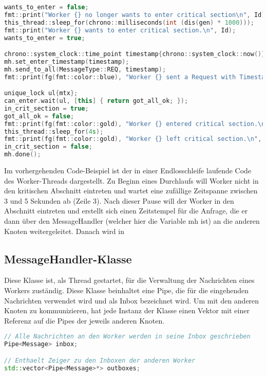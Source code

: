 \documentclass{article}
\begin{document}
\begin{minipage}{\linewidth}
\begin{lstlisting}[language=C++, caption=Zeitliche Regelung]
wants_to_enter = false;
fmt::print("Worker {} no longer wants to enter critical section\n", Id);
this_thread::sleep_for(chrono::milliseconds(int (dis(gen) * 1000)));
fmt::print("Worker {} wants to enter critical section.\n", Id);
wants_to_enter = true;

chrono::system_clock::time_point timestamp{chrono::system_clock::now()};
mh.set_enter_timestamp(timestamp);
mh.send_to_all(MessageType::REQ, timestamp);
fmt::print(fg(fmt::color::blue), "Worker {} sent a Request with Timestamp {:%H:%M:%S} to all other Workers.\n", Id, timestamp);

unique_lock ul{mtx};
can_enter.wait(ul, [this] { return got_all_ok; });
in_crit_section = true;
got_all_ok = false;
fmt::print(fg(fmt::color::gold), "Worker {} entered critical section.\n", Id);
this_thread::sleep_for(4s);
fmt::print(fg(fmt::color::gold), "Worker {} left critical section.\n", Id);
in_crit_section = false;
mh.done();

\end{lstlisting}
\end{minipage}

Im vorhergehenden Code-Beispiel ist der in einer Endlosschleife laufende Code des Worker-Threads dargestellt. Zu Beginn eines Durchlaufs will Worker nicht in den kritischen Abschnitt eintreten und wartet eine zufällige Zeitspanne zwischen 3 und 5 Sekunden ab (Zeile 3). Nach dieser Pause will der Worker in den Abschnitt eintreten und erstellt sich einen Zeitstempel für die Anfrage, die er dann über den MessageHandler (welcher hier die Variable mh ist) an die anderen Knoten weitergeleitet. Danach wird in 

\subsection{MessageHandler-Klasse}
Diese Klasse ist, als Thread gestartet, für die Verwaltung der Nachrichten eines Workers zuständig. Diese Klasse beinhaltet eine Pipe, die für die eingehenden Nachrichten verwendet wird und als Inbox bezeichnet wird. Um mit den anderen Knoten zu kommunizieren, hat jede Instanz der Klasse einen Vektor mit einer Referenz auf die Pipes der jeweils anderen Knoten.

\begin{minipage}{\linewidth}
\begin{lstlisting}[language=C++, caption=Inbox und Outbox]
// Alle Nachrichten an den Worker werden in seine Inbox geschrieben
Pipe<Message> inbox;

// Enthaelt Zeiger zu den Inboxen der anderen Worker
std::vector<Pipe<Message>*> outboxes;

\end{lstlisting}
\end{minipage}
\end{document}
